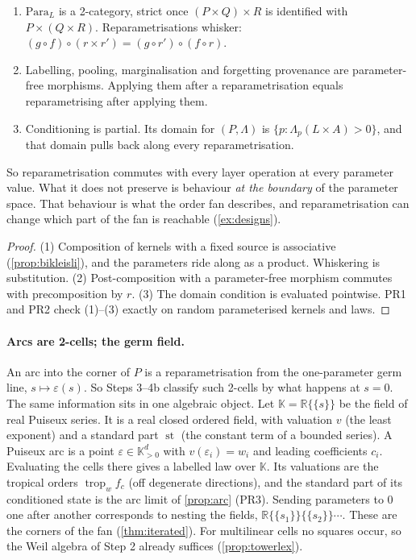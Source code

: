 \documentclass[11pt]{article}
\theoremstyle{definition}\newtheorem{definition}[theorem]{Definition}\newtheorem{remark}[theorem]{Remark}\newtheorem{example}[theorem]{Example}
\newcommand{\R}{\mathbb R}\newcommand{\D}{\mathcal D}
\begin{document}
\begin{proposition}\label{prop:para}
\begin{enumerate}
\item[(1)] $\mathrm{Para}_L$ is a 2-category, strict once $(P\times Q)\times R$ is identified with $P\times(Q\times R)$. Reparametrisations whisker:
  $(g\circ f)\circ(r\times r')=(g\circ r')\circ(f\circ r)$.
\item[(2)] Labelling, pooling, marginalisation and forgetting provenance are parameter-free morphisms. Applying them after a
  reparametrisation equals reparametrising after applying them.
\item[(3)] Conditioning is partial. Its domain for $(P,\Lambda)$ is $\{p:\Lambda_p(L\times A)>0\}$, and that domain pulls back along every
  reparametrisation.
\end{enumerate}
So reparametrisation commutes with every layer operation at every parameter value. What it does not preserve is behaviour \emph{at the
boundary} of the parameter space. That behaviour is what the order fan describes, and reparametrisation can change which part of the fan
is reachable (\cref{ex:designs}).
\end{proposition}

\begin{proof}
(1) Composition of kernels with a fixed source is associative (\cref{prop:bikleisli}), and the parameters ride along as a product. Whiskering
is substitution. (2) Post-composition with a parameter-free morphism commutes with precomposition by $r$. (3) The domain condition is
evaluated pointwise. PR1 and PR2 check (1)--(3) exactly on random parameterised kernels and laws.
\end{proof}

\paragraph{Arcs are 2-cells; the germ field.} An arc into the corner of $P$ is a reparametrisation from the one-parameter germ line,
$s\mapsto\varepsilon(s)$. So Steps 3--4b classify such 2-cells by what happens at $s=0$. The same information sits in one algebraic object. Let
$\mathbb K=\R\{\!\{s\}\!\}$ be the field of real Puiseux series. It is a real closed ordered field, with valuation $v$ (the least exponent) and a
standard part $\operatorname{st}$ (the constant term of a bounded series). A Puiseux arc is a point $\varepsilon\in\mathbb K^d_{>0}$ with $v(\varepsilon_i)=w_i$ and
leading coefficients $c_i$. Evaluating the cells there gives a labelled law over $\mathbb K$. Its valuations are the tropical orders
$\operatorname{trop}_wf_c$ (off degenerate directions), and the standard part of its conditioned state is the arc limit of \cref{prop:arc} (PR3).
Sending parameters to $0$ one after another corresponds to nesting the fields, $\R\{\!\{s_1\}\!\}\{\!\{s_2\}\!\}\cdots$. These are the corners of the fan
(\cref{thm:iterated}). For multilinear cells no squares occur, so the Weil algebra of Step 2 already suffices (\cref{prop:towerlex}).
\end{document}

